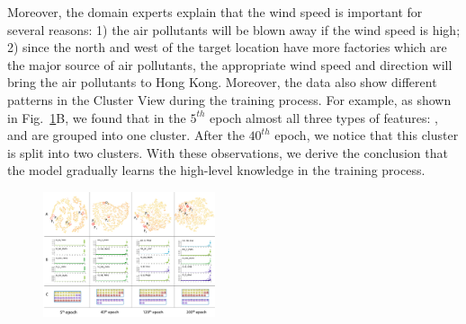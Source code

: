 Moreover, the domain experts explain that the wind speed is important for several reasons: 1) the air pollutants will  be blown away if the wind speed is high; 2) since the north and west of the target location have more factories which are the major source of air pollutants, the appropriate wind speed and direction will bring the air pollutants to Hong Kong.
Moreover, the data also show different patterns in the Cluster View during the training process. 
For example, as shown in Fig.~\ref{fig:evolution_epochs}B, we found that in the $5^{th}$ epoch almost all three types of features: \textit{\color{SLPColor}{Sealevel Pressure}}, \textit{\color{DPColor}{Dew-point}} and  \textit{\color{SPColor}{Station Pressure}} are grouped into one cluster. 
After the $40^{th}$ epoch, we notice that this cluster is split into two clusters.
With these observations, we derive the conclusion that the model gradually learns the high-level knowledge in the training process.

\begin{figure}[t]
	\centering
	\includegraphics[width=0.45\textwidth]{pictures/Evaluation/evolution_epochs.pdf}
	\vspace{-3mm}
	\caption{
	}
	\label{fig:evolution_epochs}
	\vspace{-4mm}
\end{figure}

